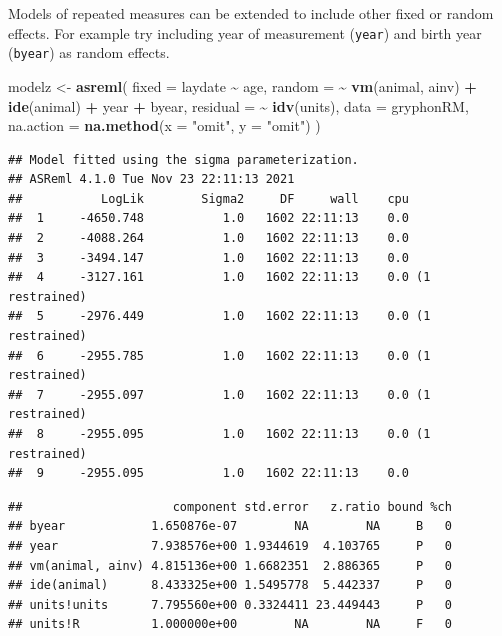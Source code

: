 \documentclass[
  12pt,
]{book}
\newenvironment{Shaded}{\begin{snugshade}}{\end{snugshade}}
\newcommand{\DataTypeTok}[1]{\textcolor[rgb]{0.13,0.29,0.53}{#1}}
\newcommand{\KeywordTok}[1]{\textcolor[rgb]{0.13,0.29,0.53}{\textbf{#1}}}
\newcommand{\NormalTok}[1]{#1}
\newcommand{\OperatorTok}[1]{\textcolor[rgb]{0.81,0.36,0.00}{\textbf{#1}}}
\newcommand{\StringTok}[1]{\textcolor[rgb]{0.31,0.60,0.02}{#1}}
\begin{document}
Models of repeated measures can be extended to include other fixed or random effects. For example try including year of measurement (\texttt{year}) and birth year (\texttt{byear}) as random effects.

\begin{Shaded}
\begin{Highlighting}[]
\NormalTok{modelz \textless{}{-}}\StringTok{ }\KeywordTok{asreml}\NormalTok{(}
  \DataTypeTok{fixed =}\NormalTok{ laydate }\OperatorTok{\textasciitilde{}}\StringTok{ }\NormalTok{age,}
  \DataTypeTok{random =} \OperatorTok{\textasciitilde{}}\StringTok{ }\KeywordTok{vm}\NormalTok{(animal, ainv) }\OperatorTok{+}\StringTok{ }\KeywordTok{ide}\NormalTok{(animal) }\OperatorTok{+}
\StringTok{    }\NormalTok{year }\OperatorTok{+}\StringTok{ }\NormalTok{byear,}
  \DataTypeTok{residual =} \OperatorTok{\textasciitilde{}}\StringTok{ }\KeywordTok{idv}\NormalTok{(units),}
  \DataTypeTok{data =}\NormalTok{ gryphonRM,}
  \DataTypeTok{na.action =} \KeywordTok{na.method}\NormalTok{(}\DataTypeTok{x =} \StringTok{"omit"}\NormalTok{, }\DataTypeTok{y =} \StringTok{"omit"}\NormalTok{)}
\NormalTok{)}
\end{Highlighting}
\end{Shaded}

\begin{verbatim}
## Model fitted using the sigma parameterization.
## ASReml 4.1.0 Tue Nov 23 22:11:13 2021
##           LogLik        Sigma2     DF     wall    cpu
##  1     -4650.748           1.0   1602 22:11:13    0.0
##  2     -4088.264           1.0   1602 22:11:13    0.0
##  3     -3494.147           1.0   1602 22:11:13    0.0
##  4     -3127.161           1.0   1602 22:11:13    0.0 (1 restrained)
##  5     -2976.449           1.0   1602 22:11:13    0.0 (1 restrained)
##  6     -2955.785           1.0   1602 22:11:13    0.0 (1 restrained)
##  7     -2955.097           1.0   1602 22:11:13    0.0 (1 restrained)
##  8     -2955.095           1.0   1602 22:11:13    0.0 (1 restrained)
##  9     -2955.095           1.0   1602 22:11:13    0.0
\end{verbatim}

\begin{Shaded}
\end{Shaded}

\begin{verbatim}
##                     component std.error   z.ratio bound %ch
## byear            1.650876e-07        NA        NA     B   0
## year             7.938576e+00 1.9344619  4.103765     P   0
## vm(animal, ainv) 4.815136e+00 1.6682351  2.886365     P   0
## ide(animal)      8.433325e+00 1.5495778  5.442337     P   0
## units!units      7.795560e+00 0.3324411 23.449443     P   0
## units!R          1.000000e+00        NA        NA     F   0
\end{verbatim}
\end{document}
